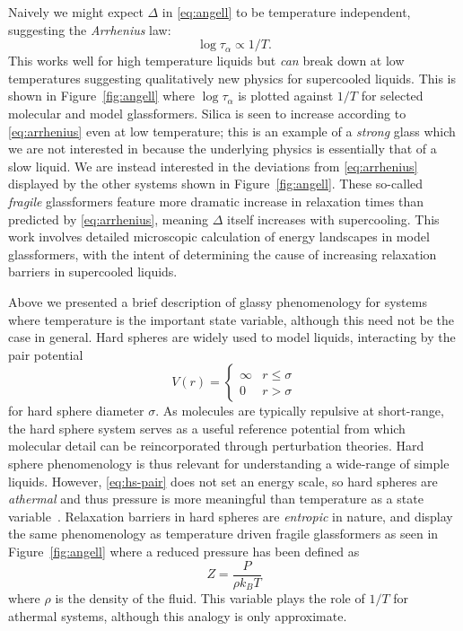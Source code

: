 Naively we might expect $\Delta$ in \eqref{eq:angell} to be temperature independent, suggesting the \emph{Arrhenius} law:
\begin{equation}\label{eq:arrhenius}
  \log{\tau_\alpha} \propto 1/T.
\end{equation}
This works well for high temperature liquids but \emph{can} break down at low temperatures suggesting qualitatively new physics for supercooled liquids.
This is shown in Figure~\ref{fig:angell} where $\log{\tau_\alpha}$ is plotted against $1/T$ for selected molecular and model glassformers.
Silica is seen to increase according to \eqref{eq:arrhenius} even at low temperature; this is an example of a \emph{strong} glass which we are not interested in because the underlying physics is essentially that of a slow liquid.
We are instead interested in the deviations from \eqref{eq:arrhenius} displayed by the other systems shown in Figure~\ref{fig:angell}.
These so-called \emph{fragile} glassformers feature more dramatic increase in relaxation times than predicted by \eqref{eq:arrhenius}, meaning $\Delta$ itself increases with supercooling.
This work involves detailed microscopic calculation of energy landscapes in model glassformers, with the intent of determining the cause of increasing relaxation barriers in supercooled liquids.

Above we presented a brief description of glassy phenomenology for systems where temperature is the important state variable, although this need not be the case in general.
Hard spheres are widely used to model liquids, interacting by the pair potential
\begin{equation}\label{eq:hs-pair}
  V(r) = \left\{
  \begin{array}{lr}
    \infty & r \le \sigma \\
    0 & r > \sigma
  \end{array}
  \right.
\end{equation}
for hard sphere diameter $\sigma$. 
As molecules are typically repulsive at short-range, the hard sphere system serves as a useful reference potential from which molecular detail can be reincorporated through perturbation theories.
Hard sphere phenomenology is thus relevant for understanding a wide-range of simple liquids.
However, \eqref{eq:hs-pair} does not set an energy scale, so hard spheres are \emph{athermal} and thus pressure is more meaningful than temperature as a state variable~\cite{Berthier2009}.
Relaxation barriers in hard spheres are \emph{entropic} in nature, and display the same phenomenology as temperature driven fragile glassformers as seen in Figure~\ref{fig:angell} where a reduced pressure has been defined as
\begin{equation}\label{eq:reduced-P}
  Z = \frac{P}{\rho k_B T}
\end{equation}
where $\rho$ is the density of the fluid. This variable plays the role of $1/T$ for athermal systems, although this analogy is only approximate.


